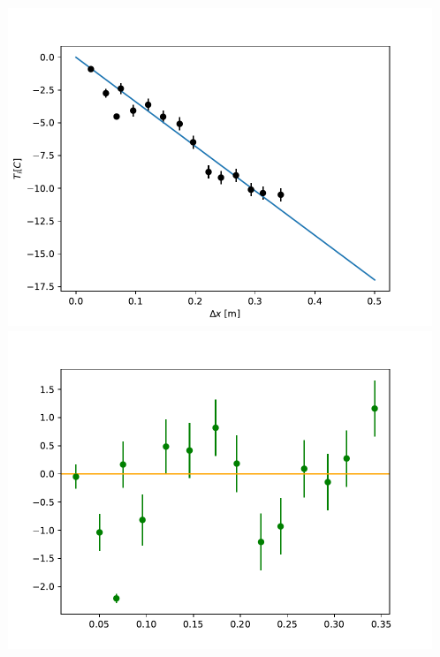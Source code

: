 \documentclass{article}
\begin{document}
\begin{figure}
	\centering
	\includegraphics[scale=0.4]{Grafico_differenze_temperatura_alluminio_dev.pdf}
	\includegraphics[scale=0.4]{Grafico_residui_alluminio_dev.pdf}
\end{figure}
\end{document}
